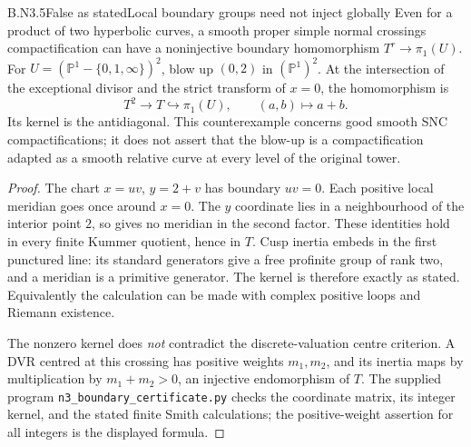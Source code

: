 \begin{claim}{B.N3.5}{False as stated}{Local boundary groups need not inject globally}
Even for a product of two hyperbolic curves, a smooth proper simple
normal crossings compactification can have a noninjective boundary
homomorphism $T^r\to\pi_1(U)$.  For
$U=(\mathbb P^1-\{0,1,\infty\})^2$, blow up $(0,2)$ in
$(\mathbb P^1)^2$.  At the intersection of the exceptional divisor
and the strict transform of $x=0$, the homomorphism is
\[
 T^2\longrightarrow T\hookrightarrow\pi_1(U),\qquad
 (a,b)\longmapsto a+b.
\]
Its kernel is the antidiagonal.  This counterexample concerns good
smooth SNC compactifications; it does not assert that the blow-up is
a compactification adapted as a smooth relative curve at every level
of the original tower.
\end{claim}
\begin{proof}
The chart $x=uv$, $y=2+v$ has boundary $uv=0$.  Each positive local
meridian goes once around $x=0$.  The $y$ coordinate lies in a
neighbourhood of the interior point $2$, so gives no meridian in the
second factor.  These identities hold in every finite Kummer
quotient, hence in $T$.  Cusp inertia embeds in the first punctured
line: its standard generators give a free profinite group of rank
two, and a meridian is a primitive generator.  The kernel is
therefore exactly as stated.  Equivalently the calculation can be
made with complex positive loops and Riemann existence.

The nonzero kernel does \emph{not} contradict the discrete-valuation
centre criterion.  A DVR centred at this crossing has positive
weights $m_1,m_2$, and its inertia maps by multiplication by
$m_1+m_2>0$, an injective endomorphism of $T$.  The supplied program
\texttt{n3\_boundary\_certificate.py} checks the coordinate matrix,
its integer kernel, and the stated finite Smith calculations; the
positive-weight assertion for all integers is the displayed formula.
\end{proof}

